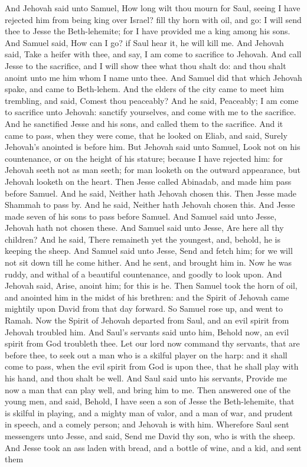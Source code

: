 And Jehovah said unto Samuel, How long wilt thou mourn for Saul, seeing I have rejected him from being king over Israel? fill thy horn with oil, and go: I will send thee to Jesse the Beth-lehemite; for I have provided me a king among his sons. And Samuel said, How can I go? if Saul hear it, he will kill me. And Jehovah said, Take a heifer with thee, and say, I am come to sacrifice to Jehovah. And call Jesse to the sacrifice, and I will show thee what thou shalt do: and thou shalt anoint unto me him whom I name unto thee. And Samuel did that which Jehovah spake, and came to Beth-lehem. And the elders of the city came to meet him trembling, and said, Comest thou peaceably? And he said, Peaceably; I am come to sacrifice unto Jehovah: sanctify yourselves, and come with me to the sacrifice. And he sanctified Jesse and his sons, and called them to the sacrifice.  And it came to pass, when they were come, that he looked on Eliab, and said, Surely Jehovah’s anointed is before him. But Jehovah said unto Samuel, Look not on his countenance, or on the height of his stature; because I have rejected him: for Jehovah seeth not as man seeth; for man looketh on the outward appearance, but Jehovah looketh on the heart. Then Jesse called Abinadab, and made him pass before Samuel. And he said, Neither hath Jehovah chosen this. Then Jesse made Shammah to pass by. And he said, Neither hath Jehovah chosen this. And Jesse made seven of his sons to pass before Samuel. And Samuel said unto Jesse, Jehovah hath not chosen these. And Samuel said unto Jesse, Are here all thy children? And he said, There remaineth yet the youngest, and, behold, he is keeping the sheep. And Samuel said unto Jesse, Send and fetch him; for we will not sit down till he come hither. And he sent, and brought him in. Now he was ruddy, and withal of a beautiful countenance, and goodly to look upon. And Jehovah said, Arise, anoint him; for this is he. Then Samuel took the horn of oil, and anointed him in the midst of his brethren: and the Spirit of Jehovah came mightily upon David from that day forward. So Samuel rose up, and went to Ramah.  Now the Spirit of Jehovah departed from Saul, and an evil spirit from Jehovah troubled him. And Saul’s servants said unto him, Behold now, an evil spirit from God troubleth thee. Let our lord now command thy servants, that are before thee, to seek out a man who is a skilful player on the harp: and it shall come to pass, when the evil spirit from God is upon thee, that he shall play with his hand, and thou shalt be well. And Saul said unto his servants, Provide me now a man that can play well, and bring him to me. Then answered one of the young men, and said, Behold, I have seen a son of Jesse the Beth-lehemite, that is skilful in playing, and a mighty man of valor, and a man of war, and prudent in speech, and a comely person; and Jehovah is with him. Wherefore Saul sent messengers unto Jesse, and said, Send me David thy son, who is with the sheep. And Jesse took an ass laden with bread, and a bottle of wine, and a kid, and sent them 